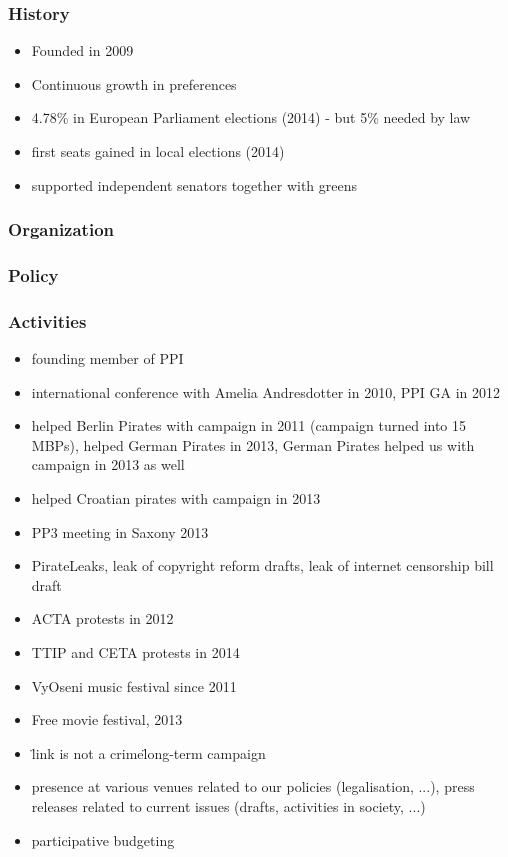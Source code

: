 \begin{frame}
	\frametitle{History}
	\begin{itemize}
		\item Founded in 2009
		\item Continuous growth in preferences 
		\item 4.78\% in European Parliament elections (2014) - but 5\% needed by law
		\item first seats gained in local elections (2014)
		\item supported independent senators together with greens
	\end{itemize}
\end{frame}
\begin{frame}
	\frametitle{Organization}
\end{frame}
\begin{frame}
	\frametitle{Policy}
\end{frame}
\begin{frame}
	\frametitle{Activities}
	\begin{itemize}
		\item founding member of PPI
		\item international conference with Amelia Andresdotter in 2010, PPI GA in 2012
		\item helped Berlin Pirates with campaign in 2011 (campaign turned into 15 MBPs), helped German Pirates in 2013, German Pirates helped us with campaign in 2013 as well
		\item helped Croatian pirates with campaign in 2013
		\item PP3 meeting in Saxony 2013
		\item PirateLeaks, leak of copyright reform drafts, leak of internet censorship bill draft
		\item ACTA protests in 2012
		\item TTIP and CETA protests in 2014
		\item VyOseni music festival since 2011
		\item Free movie festival, 2013
		\item \"link is not a crime\" long-term campaign
		\item presence at various venues related to our policies (legalisation, ...), press releases related to current issues (drafts, activities in society, ...)
		\item participative budgeting
	\end{itemize}
\end{frame}
